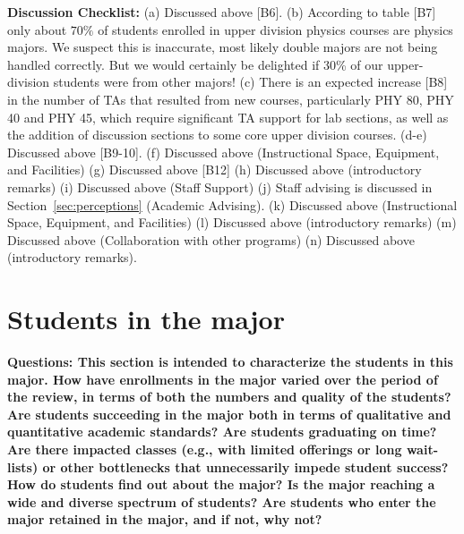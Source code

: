 \documentclass[12pt]{article}
\begin{document}
\noindent
{\bf Discussion Checklist:} (a) Discussed above [B6].  (b) According
to table [B7] only about $70\%$ of students enrolled in upper division
physics courses are physics majors.  We suspect this is inaccurate,
most likely double majors are not being handled correctly.  But we
would certainly be delighted if 30\% of our upper-division students
were from other majors! (c) There is an expected increase [B8] in the
number of TAs that resulted from new courses, particularly PHY 80, PHY
40 and PHY 45, which require significant TA support for lab sections,
as well as the addition of discussion sections to some core upper
division courses.  (d-e) Discussed above [B9-10]. (f) Discussed above
(Instructional Space, Equipment, and Facilities) (g) Discussed above
[B12] (h) Discussed above (introductory remarks) (i) Discussed above
(Staff Support) (j) Staff advising is discussed in
Section~\ref{sec:perceptions} (Academic Advising).  (k) Discussed
above (Instructional Space, Equipment, and Facilities) (l) Discussed
above (introductory remarks) (m) Discussed above (Collaboration with
other programs) (n) Discussed above (introductory remarks).

\newpage
\section{Students in the major}
\label{sec:students}

{\bf Questions: This section is intended to characterize the students
  in this major. How have enrollments in the major varied over the
  period of the review, in terms of both the numbers and quality of
  the students? Are students succeeding in the major both in terms of
  qualitative and quantitative academic standards? Are students
  graduating on time? Are there impacted classes (e.g., with limited
  offerings or long wait-lists) or other bottlenecks that
  unnecessarily impede student success? How do students find out about
  the major?  Is the major reaching a wide and diverse spectrum of
  students? Are students who enter the major retained in the major,
  and if not, why not?}\\[3pt]
\end{document}
